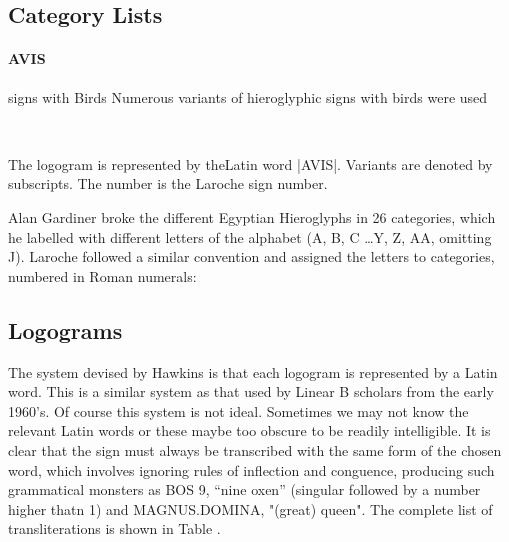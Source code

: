 


\subsection{Category Lists}

\paragraph{AVIS} signs with Birds Numerous variants of hieroglyphic signs with birds were used \scalebox{1.8}{\anatolian \char"1449A \char"1449B \char"1449C \char"1449D \char"1449E}
 
\begin{center} 
 \avis \avisii \avisiii \avisiv \avisv\\
 \domina \adorare \bibere
\end{center} 

The logogram is represented by theLatin word |AVIS|. Variants are denoted by subscripts. The number is the Laroche sign number.

Alan Gardiner broke the different Egyptian Hieroglyphs in 26 categories, which he labelled with different letters of the alphabet (A, B, C \ldots Y, Z, AA, omitting J). Laroche followed a similar convention and assigned the letters to categories, numbered in Roman numerals:


 
 \subsection{Logograms}
 
 The system devised by Hawkins is that each logogram is represented by a Latin word. This is a similar system as that used by Linear B scholars from the early 1960's. Of course this system is not ideal. Sometimes we may not know the relevant Latin words or these maybe too obscure to be readily intelligible. It is clear that the sign must always be transcribed 
with the same form of the chosen word, which involves ignoring rules of inflection and conguence, producing such grammatical monsters as BOS 9, ``nine oxen'' (singular followed by a number higher thatn 1) and MAGNUS.DOMINA, "(great) queen". The complete list of transliterations is shown in Table .

 
 